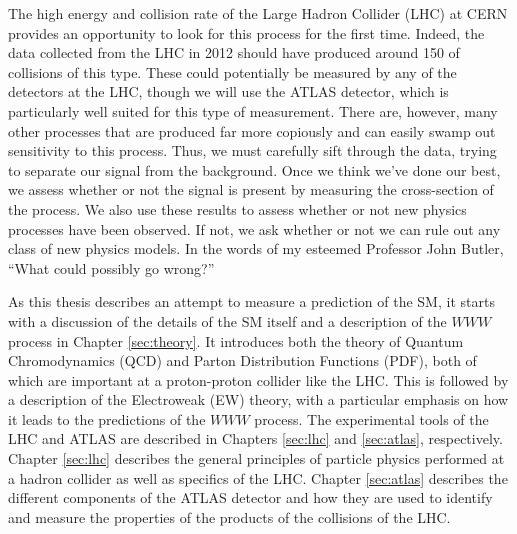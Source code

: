The high energy and collision rate of the Large Hadron Collider (LHC) at CERN
provides an opportunity to look for this process for the first time. 
Indeed, the data collected from the LHC in 2012 should have produced around 150 of collisions
of this type. These could potentially be measured by any of the detectors
at the LHC, though we will use the ATLAS detector, which is particularly well suited 
for this type of measurement. There are, however, many other processes that are produced
far more copiously and can easily swamp out sensitivity to this process. 
Thus, we must carefully sift through the data, trying to separate our signal
from the background.  Once we think we've done our best, we assess 
whether or not the signal is present by measuring the cross-section of the process. 
We also use these results to assess whether or not new physics processes have been 
observed. If not, we ask whether or not 
we can rule out any class of new physics models. 
In the words of my esteemed Professor John Butler, ``What could possibly
go wrong?''


As this thesis describes an attempt to measure a prediction of the SM, it starts
with a discussion of the details of the SM itself and a description of the 
$WWW$ process in Chapter \ref{sec:theory}. It introduces both the theory 
of Quantum Chromodynamics (QCD) and Parton Distribution Functions (PDF), both
of which are important at a proton-proton collider like the LHC.  
This is followed by 
a description of the Electroweak (EW) theory, with a particular emphasis
on how it leads to the predictions of the $WWW$ process. The experimental
tools of the LHC and ATLAS are described in Chapters \ref{sec:lhc} and
\ref{sec:atlas}, respectively. Chapter \ref{sec:lhc}
describes the general principles of particle physics performed at a hadron collider
as well as specifics of the LHC. 
Chapter \ref{sec:atlas} describes the different components of the ATLAS detector
and how they are used to identify and measure the properties of the products
of the collisions of the LHC.  

